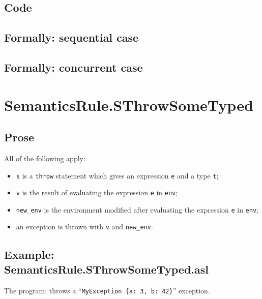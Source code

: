 \documentclass{book}
\begin{document}
  \subsection{Code}

\begin{emptyformal}
  \subsection{Formally: sequential case}

  \subsection{Formally: concurrent case}
\end{emptyformal}


\section{SemanticsRule.SThrowSomeTyped \label{sec:SemanticsRule.SThrowSomeTyped}}

    \subsection{Prose}
    All of the following apply:
    \begin{itemize}
    \item \texttt{s} is a \texttt{throw} statement which gives an expression \texttt{e} and a type \texttt{t};
    \item \texttt{v} is the result of evaluating the expression \texttt{e} in \texttt{env};
    \item \texttt{new\_env} is the environment modified after evaluating the expression \texttt{e} in \texttt{env};
    \item an exception is thrown with \texttt{v} and \texttt{new\_env}.
    \end{itemize}

    \subsection{Example: SemanticsRule.SThrowSomeTyped.asl}
    The program:
    throws a ``\texttt{MyException \{a: 3, b: 42\}}'' exception.
\end{document}
